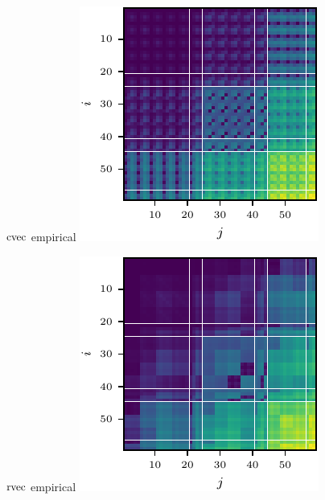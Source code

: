 \begin{figure}[!h]
\begin{minipage}[t]{0.49\linewidth}
  \end{minipage}
  \begin{minipage}[t]{0.49\linewidth}
    \centering
    $\operatorname{cvec}$ empirical\vspace{1ex}
    \includegraphics[width=1.0\linewidth]{../kfs/plots/synthetic_cvec_empfisher.pdf}
  \end{minipage}
  \hfill
  \begin{minipage}[t]{0.49\linewidth}
    \centering
    $\operatorname{rvec}$ empirical\vspace{1ex}
    \includegraphics[width=1.0\linewidth]{../kfs/plots/synthetic_rvec_empfisher.pdf}

\end{minipage}
\end{figure}

